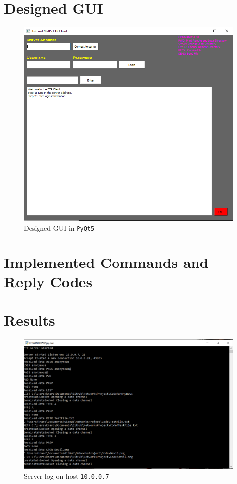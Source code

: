 \documentclass[10pt,twocolumn]{witseiepaper}
\def\code#1{\texttt{#1}}
\begin{document}
\onecolumn
\begin{appendices}

\section{Designed GUI}
\label{app: GUI}
\begin{figure}[h!]
\renewcommand{\thefigure}{\arabic{figure}}
\centering
\includegraphics[scale=0.8]{GUI.png}
\caption{Designed GUI in \code{PyQt5}}
\label{fig: GUI}
\end{figure}


\pagebreak
\section{Implemented Commands and Reply Codes}
\label{app: Commands}

\pagebreak
\section{Results}
\label{app: Results}

\begin{figure}[h!]
\renewcommand{\thefigure}{\arabic{figure}}
\centering
\includegraphics[scale=0.6]{Server.png}
\caption{Server log on host \code{10.0.0.7}}
\label{fig: Server log}
\end{figure}


\end{appendices}
\end{document}
